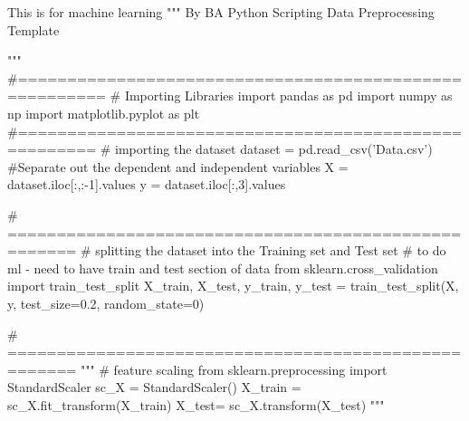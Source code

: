 
This is for machine learning
"""
By BA
Python Scripting
Data Preprocessing Template 

"""
#=======================================================
# Importing Libraries
import pandas as pd
import numpy as np
import matplotlib.pyplot as plt
#======================================================
# importing the dataset
dataset = pd.read_csv('Data.csv')
#Separate out the dependent and independent variables
X = dataset.iloc[:,:-1].values
y = dataset.iloc[:,3].values

# =====================================================
# splitting the dataset into the Training set and Test set
# to do ml - need to have train  and test section of data
from sklearn.cross_validation import train_test_split
X_train, X_test, y_train, y_test = train_test_split(X, y, test_size=0.2, random_state=0)

# =====================================================
"""
# feature scaling
from sklearn.preprocessing import StandardScaler
sc_X = StandardScaler()
X_train = sc_X.fit_transform(X_train)
X_test= sc_X.transform(X_test)
"""
